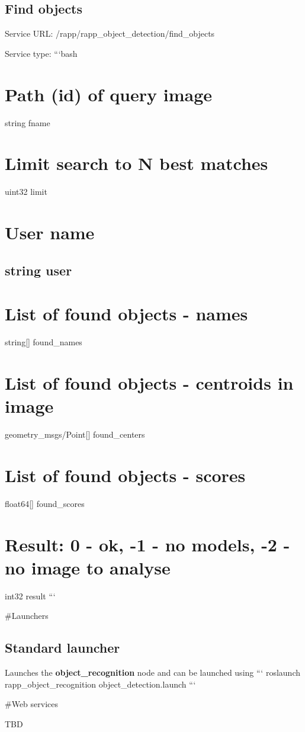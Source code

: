 \subsection*{Find objects}

Service U\-R\-L\-: {\ttfamily /rapp/rapp\-\_\-object\-\_\-detection/find\-\_\-objects}

Service type\-: ```bash \section*{Path (id) of query image}

string fname \section*{Limit search to N best matches}

uint32 limit \section*{User name}

\subsection*{string user }

\section*{List of found objects -\/ names}

string\mbox{[}\mbox{]} found\-\_\-names \section*{List of found objects -\/ centroids in image}

geometry\-\_\-msgs/\-Point\mbox{[}\mbox{]} found\-\_\-centers \section*{List of found objects -\/ scores}

float64\mbox{[}\mbox{]} found\-\_\-scores \section*{Result\-: 0 -\/ ok, -\/1 -\/ no models, -\/2 -\/ no image to analyse}

int32 result ```

\#\-Launchers

\subsection*{Standard launcher}

Launches the {\bfseries object\-\_\-recognition} node and can be launched using ``` roslaunch rapp\-\_\-object\-\_\-recognition object\-\_\-detection.\-launch ```

\#\-Web services

T\-B\-D 